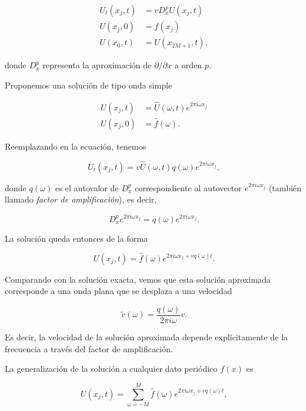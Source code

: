 \documentclass[12pt]{article}
\begin{document}
\begin{align}
U_t(x_j, t) &= v D_x^p U(x_j, t) \nonumber \\
U(x_j, 0) &= f(x_j) \\
U(x_0,t) &= U(x_{2M+1},t) \nonumber,
\end{align}

donde $D_x^p$ representa la aproximaci\'on de $\partial/\partial x$ a orden $p$.

Proponemos una soluci\'on de tipo onda simple 

\begin{align*}
U(x_j,t) &= \hat{U}(\omega, t) e^{2\pi i \omega x_j} \\
U(x_j, 0) &= \hat{f}(\omega).
\end{align*}

Reemplazando en la ecuaci\'on, tenemos

\begin{equation}
U_t(x_j, t) =  v\hat{U}(\omega, t) q(\omega) e^{2\pi i \omega x_j},
\end{equation}

donde $q(\omega)$ es el autovalor de $D_x^p$ correspondiente al autovector $e^{2\pi i \omega x_j}$ (tambi\'en llamado \emph{factor de amplificaci\'on}), es decir, 

\begin{equation}
D_x^p e^{2\pi i \omega x_j} = q(\omega) e^{2\pi i \omega x_j}.
\end{equation}

La soluci\'on queda entonces de la forma 

\begin{equation}
U(x_j,t) = \hat{f}(\omega) e^{2\pi i \omega x_j + v q(\omega) t}.
\end{equation}

Comparando con la soluci\'on exacta, vemos que esta soluci\'on aproximada corresponde a una onda plana que se desplaza a una velocidad 

\begin{equation}
\tilde{v}(\omega) = \dfrac{q(\omega)}{2\pi i\omega} v.
\end{equation}

Es decir, la velocidad de la soluci\'on aproximada depende expl\'icitamente de la frecuencia a trav\'es del factor de amplificaci\'on.

La generalizaci\'on de la soluci\'on a cualquier dato peri\'odico $f(x)$ es 

\begin{equation} \label{eq:sol_general}
U(x_j, t) = \sum_{\omega=-M}^M \hat{f}(\omega)  e^{2\pi i \omega x_j + v q(\omega) t},
\end{equation}
\end{document}
